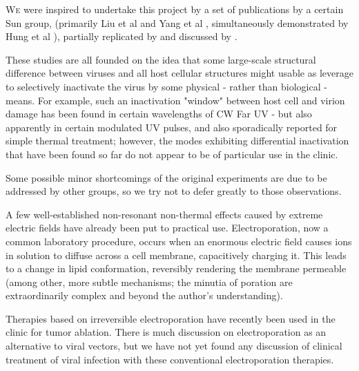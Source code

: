 \documentclass[paper.tex]{subfiles}
\begin{document}
\begin{multicols}{1}

\lettrine{W}e were inspired to undertake this project by a set of publications by a certain Sun group, (primarily Liu et al \cite{Microwave2009} and Yang et al \cite{Efficient2015}, simultaneously demonstrated by Hung et al \cite{focusing2014}), partially replicated by \cite{Optical2020} and discussed by \cite{Theoretical2020}.


These studies are all founded on the idea that some large-scale structural difference between viruses and all host cellular structures might usable as leverage to selectively inactivate the virus by some physical - rather than biological - means. For example, such an inactivation "window" between host cell and virion damage has been found in certain wavelengths of CW Far UV\cite{Germicidal2017} - but also apparently in certain modulated UV pulses\cite{Use1987a}\cite{Can1993}, and also sporadically reported for simple thermal treatment\cite{Summary}; however, the modes exhibiting differential inactivation that have been found so far do not appear to be of particular use in the clinic.

Some possible minor shortcomings of the original experiments are due to be addressed by other groups\cite{Generating}, so we try not to defer greatly to those observations.

A few well-established non-resonant non-thermal effects caused by extreme electric fields have already been put to practical use. Electroporation\cite{Electroporation1988}, now a common laboratory procedure, occurs when an enormous electric field causes ions in solution to diffuse across a cell membrane, capacitively charging it. This leads to a change in lipid conformation, reversibly rendering the membrane permeable (among other, more subtle mechanisms; the minutia of poration are extraordinarily complex and beyond the author's understanding\cite{Theoretical2007}). 

Therapies based on irreversible electroporation\cite{Nonthermal2013}\cite{Lipid2017} have recently been used in the clinic\cite{Irreversible2013} for tumor ablation. There is much discussion on electroporation as an alternative to viral vectors, but we have not yet found any discussion of clinical treatment of viral infection with these conventional electroporation therapies.%


\end{multicols}
\end{document}
